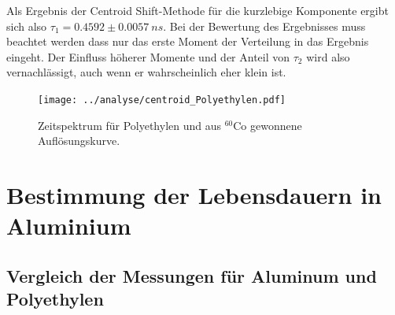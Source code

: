 \documentclass[a4paper,12pt]{article}
\begin{document}
Als Ergebnis der Centroid Shift-Methode für die kurzlebige Komponente ergibt sich also $τ_1 = 0.4592 \pm \SI{0.0057}{ns}$. Bei der Bewertung des Ergebnisses muss beachtet werden dass nur das 
erste Moment der Verteilung in das Ergebnis eingeht. Der Einfluss höherer Momente und der Anteil von $τ_2$ wird also vernachlässigt, auch wenn er wahrscheinlich eher klein ist.
\begin{figure}
	\texttt{[image: ../analyse/centroid\_Polyethylen.pdf]}
	\caption{Zeitspektrum für Polyethylen und aus $^{60}$Co gewonnene Auflösungskurve. }
	\label{fig:compare_signal}
\end{figure}
 
\section{Bestimmung der Lebensdauern in Aluminium}

\subsection{Vergleich der Messungen für Aluminum und Polyethylen}
\end{document}

